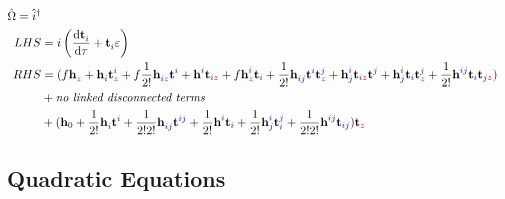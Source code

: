 \documentclass{article}
\newcommand{\bh}{\textbf{h}}
\newcommand{\bt}{\textbf{t}}
\newcommand{\up}[1]{\hat{#1}^{\dagger}}
\begin{document}
%
%
%
%
%

\begin{align}\begin{split}
    \hat{\Omega} = \up{i}
\\ LHS &=
    i\left(\dv{\bt^{}_{i}}{\tau} + \bt^{}_{i}\varepsilon\right)
\\ RHS &=
%
%
(f\bh^{\blue{}\red{}}_{\blue{}\red{z}} + \bh^{\blue{}\red{}}_{\blue{i}\red{}}\bt^{\blue{i}\red{}}_{\blue{}\red{z}} + f\frac{1}{2!}\bh^{\blue{}\red{}}_{\blue{i}\red{z}}\bt^{\blue{i}\red{}} + \bh^{\blue{i}\red{}}_{\blue{}\red{}}\bt_{\blue{i}\red{z}} + f\bh^{\blue{i}\red{}}_{\blue{}\red{z}}\bt_{\blue{i}\red{}} + \frac{1}{2!}\bh^{\blue{}\red{}}_{\blue{ij}\red{}}\bt^{\blue{i}\red{}}\bt^{\blue{j}\red{}}_{\blue{}\red{z}} + \bh^{\blue{i}\red{}}_{\blue{j}\red{}}\bt_{\blue{i}\red{z}}\bt^{\blue{j}\red{}} + \bh^{\blue{i}\red{}}_{\blue{j}\red{}}\bt_{\blue{i}\red{}}\bt^{\blue{j}\red{}}_{\blue{}\red{z}} + \frac{1}{2!}\bh^{\blue{ij}\red{}}_{\blue{}\red{}}\bt_{\blue{i}\red{}}\bt_{\blue{j}\red{z}})
%
%
\\  &+
%
%
    \textit{no linked disconnected terms}
%
%
\\  &+
%
%
(\bh_0 + \frac{1}{2!}\bh^{\blue{}\red{}}_{\blue{i}\red{}}\bt^{\blue{i}\red{}} + \frac{1}{2!2!}\bh^{\blue{}\red{}}_{\blue{ij}\red{}}\bt^{\blue{ij}\red{}} + \frac{1}{2!}\bh^{\blue{i}\red{}}_{\blue{}\red{}}\bt_{\blue{i}\red{}} + \frac{1}{2!}\bh^{\blue{i}\red{}}_{\blue{j}\red{}}\bt^{\blue{j}\red{}}_{\blue{i}\red{}} + \frac{1}{2!2!}\bh^{\blue{ij}\red{}}_{\blue{}\red{}}\bt_{\blue{ij}\red{}})\bt_{\blue{}\red{z}}
\end{split}\end{align}

%
%
%
%
%

\newpage
\subsection{Quadratic Equations}
\end{document}
